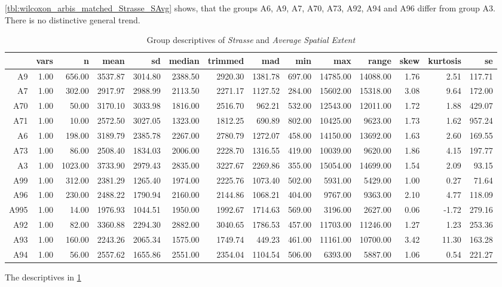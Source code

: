 \cref{tbl:wilcoxon_arbis_matched_Strasse_SAvg} shows, that the groups A6, A9, A7, A70, A73, A92, A94 and A96 differ from group A3. There is no distinctive general trend.
\begin{table}[ht!]
	\tiny
	\centering
  \begin{tabular}{rrrrrrrrrrrrrr}
    \hline
    & vars & n & mean & sd & median & trimmed & mad & min & max & range & skew & kurtosis & se \\ 
    \hline
    A9   & 1.00 & 656.00 & 3537.87 & 3014.80 & 2388.50 & 2920.30 & 1381.78 & 697.00 & 14785.00 & 14088.00 & 1.76 & 2.51 & 117.71 \\ 
    A7   & 1.00 & 302.00 & 2917.97 & 2988.99 & 2113.50 & 2271.17 & 1127.52 & 284.00 & 15602.00 & 15318.00 & 3.08 & 9.64 & 172.00 \\ 
    A70  & 1.00 & 50.00 & 3170.10 & 3033.98 & 1816.00 & 2516.70 & 962.21 & 532.00 & 12543.00 & 12011.00 & 1.72 & 1.88 & 429.07 \\ 
    A71  & 1.00 & 10.00 & 2572.50 & 3027.05 & 1323.00 & 1812.25 & 690.89 & 802.00 & 10425.00 & 9623.00 & 1.73 & 1.62 & 957.24 \\ 
    A6   & 1.00 & 198.00 & 3189.79 & 2385.78 & 2267.00 & 2780.79 & 1272.07 & 458.00 & 14150.00 & 13692.00 & 1.63 & 2.60 & 169.55 \\ 
    A73  & 1.00 & 86.00 & 2508.40 & 1834.03 & 2006.00 & 2228.70 & 1316.55 & 419.00 & 10039.00 & 9620.00 & 1.86 & 4.15 & 197.77 \\ 
    A3   & 1.00 & 1023.00 & 3733.90 & 2979.43 & 2835.00 & 3227.67 & 2269.86 & 355.00 & 15054.00 & 14699.00 & 1.54 & 2.09 & 93.15 \\ 
    A99  & 1.00 & 312.00 & 2381.29 & 1265.40 & 1974.00 & 2225.76 & 1073.40 & 502.00 & 5931.00 & 5429.00 & 1.00 & 0.27 & 71.64 \\ 
    A96  & 1.00 & 230.00 & 2488.22 & 1790.94 & 2160.00 & 2144.86 & 1068.21 & 404.00 & 9767.00 & 9363.00 & 2.10 & 4.77 & 118.09 \\ 
    A995 & 1.00 & 14.00 & 1976.93 & 1044.51 & 1950.00 & 1992.67 & 1714.63 & 569.00 & 3196.00 & 2627.00 & 0.06 & -1.72 & 279.16 \\ 
    A92  & 1.00 & 82.00 & 3360.88 & 2294.30 & 2882.00 & 3040.65 & 1786.53 & 457.00 & 11703.00 & 11246.00 & 1.27 & 1.23 & 253.36 \\ 
    A93  & 1.00 & 160.00 & 2243.26 & 2065.34 & 1575.00 & 1749.74 & 449.23 & 461.00 & 11161.00 & 10700.00 & 3.42 & 11.30 & 163.28 \\  
    A94  & 1.00 & 56.00 & 2557.62 & 1655.86 & 2551.00 & 2354.04 & 1104.54 & 506.00 & 6393.00 & 5887.00 & 1.06 & 0.54 & 221.27 \\ 
    \hline
  \end{tabular}
	\caption{Group descriptives of \textit{Strasse} and \textit{Average Spatial Extent}}
	\label{tbl:descriptives_arbis_matched_Strasse_SAvg}
\end{table}
The descriptives in \cref{tbl:descriptives_arbis_matched_Strasse_SAvg}

